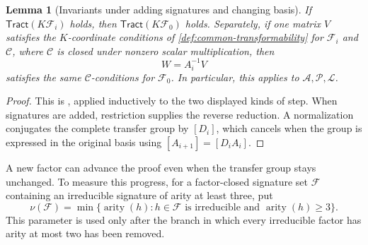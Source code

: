 \documentclass[11pt,letterpaper,onecolumn]{article}
\theoremstyle{plain}
\newtheorem{lemma}[lemma]{Lemma}
\theoremstyle{definition}
\theoremstyle{remark}
\newcommand{\cF}{\mathcal F}
\newcommand{\cA}{\mathscr A}
\newcommand{\cP}{\mathscr P}
\newcommand{\cL}{\mathscr L}
\newcommand{\cC}{\mathscr C}
\newcommand{\Tract}{\mathsf{Tract}}
\newcommand{\arity}{\operatorname{arity}}
\begin{document}
\begin{lemma}[Invariants under adding signatures and changing basis]
		If \(\Tract(K\cF_i)\) holds, then \(\Tract(K\cF_0)\) holds.
		Separately, if one matrix \(V\) satisfies the \(K\)-coordinate
		conditions of \cref{def:common-transformability} for
		\(\cF_i\) and \(\cC\), where \(\cC\) is closed under nonzero scalar multiplication,
		then
		\[
		W=A_i^{-1}V
		\]
		satisfies the same \(\cC\)-conditions for \(\cF_0\).  In particular, this
		applies to \(\cA,\cP,\cL\).
	\end{lemma}
	
	\begin{proof}
		This is \cite[Lemma~2.26]{Liu2026DEQ2Holant}, applied inductively to the two
		displayed kinds of step.  When signatures are added, restriction supplies the reverse reduction.  A normalization conjugates the complete transfer group by
		\([D_i]\), which cancels when the group is expressed in the original basis using
		\([A_{i+1}]=[D_iA_i]\).
	\end{proof}
	
	A new factor can advance the proof even when the transfer group stays
	unchanged. To measure this progress, for a factor-closed signature set
	\(\cF\) containing an irreducible signature of arity at least three, put
	\begin{equation*}
		\nu(\cF)
		=\min\{\arity(h):h\in\cF
		\text{ is irreducible and }\arity(h)\ge3\}.
	\end{equation*}
	This parameter is used only after the branch in which every irreducible factor has
	arity at most two has been removed.
	
	
	
\end{document}
